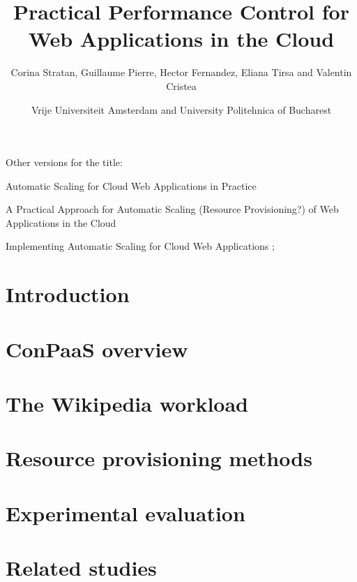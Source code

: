 \documentclass[10pt,twocolumn]{article}
\begin{document}
\begin{multicols}{2}
\title{Practical Performance Control for Web Applications in the Cloud}
\author{Corina Stratan, Guillaume Pierre, Hector Fernandez, Eliana Tirsa and Valentin Cristea} 
\date{Vrije Universiteit Amsterdam and University Politehnica of Bucharest}
\maketitle
\end{multicols}


Other versions for the title:

Automatic Scaling for Cloud Web Applications in Practice

A Practical Approach for Automatic Scaling (Resource Provisioning?) of
Web Applications in the Cloud

Implementing Automatic Scaling for Cloud Web Applications
;

\section{Introduction}



\section{ConPaaS overview \label{conpaas}}



\section{The Wikipedia workload \label{wikipedia}}



\section{Resource provisioning methods \label{provisioning}}



\section{Experimental evaluation \label{experiments}}



\section{Related studies \label{studies}}
\end{document}
